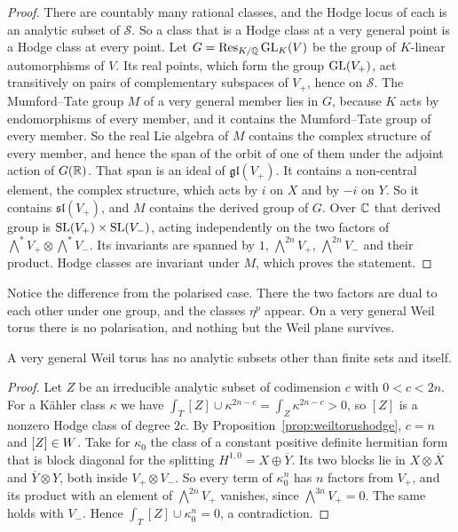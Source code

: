 \begin{proof}
There are countably many rational classes, and the Hodge locus of each is
an analytic subset of $\mathcal S$. So a class that is a Hodge class at a very
general point is a Hodge class at every point. Let
$G=\operatorname{Res}_{K/\mathbb{Q}}\operatorname{GL}_{K}(V)$ be the group of $K$-linear
automorphisms of $V$. Its real points, which form the group $\operatorname{GL}(V_{+})$,
act transitively on pairs of complementary subspaces of $V_{+}$, hence on
$\mathcal S$. The Mumford--Tate group $M$ of a very general member lies in $G$,
because $K$ acts by endomorphisms of every member, and it contains the
Mumford--Tate group of every member. So the real Lie algebra of $M$
contains the complex structure of every member, and hence the span of the
orbit of one of them under the adjoint action of $G(\mathbb{R})$. That span is an
ideal of $\mathfrak{gl}(V_{+})$. It contains a non-central element, the
complex structure, which acts by $i$ on $X$ and by $-i$ on $Y$. So it
contains $\mathfrak{sl}(V_{+})$, and $M$ contains the derived group of $G$.
Over $\mathbb{C}$ that derived group is $\operatorname{SL}(V_{+})\times\operatorname{SL}(V_{-})$, acting
independently on the two factors of
$\bigwedge^{*}V_{+}\otimes\bigwedge^{*}V_{-}$. Its invariants are spanned by
$1$, $\bigwedge^{2n}V_{+}$, $\bigwedge^{2n}V_{-}$ and their product. Hodge
classes are invariant under $M$, which proves the statement.
\end{proof}

Notice the difference from the polarised case. There the two factors are
dual to each other under one group, and the classes $\eta^{p}$ appear. On a
very general Weil torus there is no polarisation, and nothing but the Weil
plane survives.

\begin{lemma}\label{lem:weiltorussub}
A very general Weil torus has no analytic subsets other than finite sets
and itself.
\end{lemma}

\begin{proof}
Let $Z$ be an irreducible analytic subset of codimension $c$ with
$0<c<2n$. For a K\"ahler class $\kappa$ we have
$\int_{T}[Z]\cup\kappa^{2n-c}=\int_{Z}\kappa^{2n-c}>0$, so $[Z]$ is a nonzero
Hodge class of degree $2c$. By Proposition~\ref{prop:weiltorushodge}, $c=n$
and $[Z]\in W$. Take for $\kappa_{0}$ the class of a constant positive
definite hermitian form that is block diagonal for the splitting
$H^{1,0}=X\oplus\overline{Y}$. Its two blocks lie in $X\otimes\overline{X}$
and $\overline{Y}\otimes Y$, both inside $V_{+}\otimes V_{-}$. So every term
of $\kappa_{0}^{n}$ has $n$ factors from $V_{+}$, and its product with an
element of $\bigwedge^{2n}V_{+}$ vanishes, since $\bigwedge^{3n}V_{+}=0$. The
same holds with $V_{-}$. Hence $\int_{T}[Z]\cup\kappa_{0}^{n}=0$, a
contradiction.
\end{proof}

